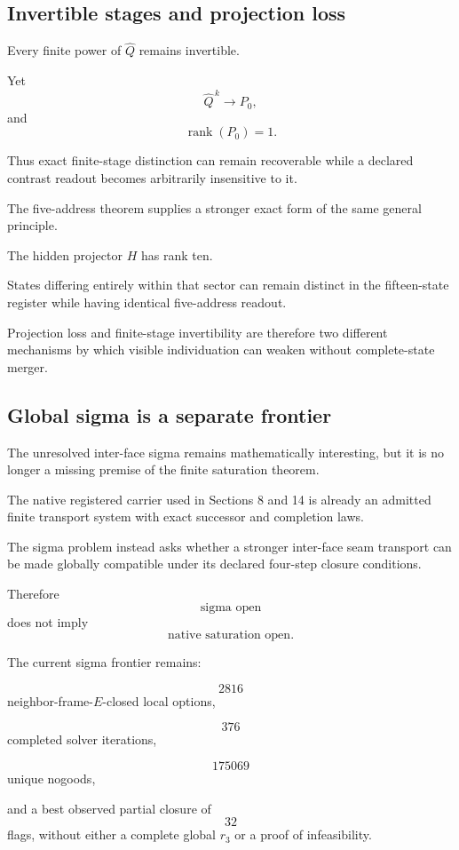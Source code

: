 \subsection{Invertible stages and projection loss}

Every finite power of \(\widehat Q\) remains invertible.

Yet
\[
\widehat Q^{\,k}\longrightarrow P_0,
\]
and
\[
\operatorname{rank}(P_0)=1.
\]

Thus exact finite-stage distinction can remain recoverable while a
declared contrast readout becomes arbitrarily insensitive to it.

The five-address theorem supplies a stronger exact form of the same
general principle.

The hidden projector \(H\) has rank ten.

States differing entirely within that sector can remain distinct in
the fifteen-state register while having identical five-address
readout.

Projection loss and finite-stage invertibility are therefore two
different mechanisms by which visible individuation can weaken
without complete-state merger.

\subsection{Global sigma is a separate frontier}

The unresolved inter-face sigma remains mathematically interesting,
but it is no longer a missing premise of the finite saturation
theorem.

The native registered carrier used in Sections 8 and 14 is already
an admitted finite transport system with exact successor and
completion laws.

The sigma problem instead asks whether a stronger inter-face seam
transport can be made globally compatible under its declared
four-step closure conditions.

Therefore
\[
\text{sigma open}
\]
does not imply
\[
\text{native saturation open}.
\]

The current sigma frontier remains:

\[
2816
\]
neighbor-frame-\(E\)-closed local options,

\[
376
\]
completed solver iterations,

\[
175069
\]
unique nogoods,

and a best observed partial closure of
\[
32
\]
flags, without either a complete global \(r_3\) or a proof of
infeasibility.

